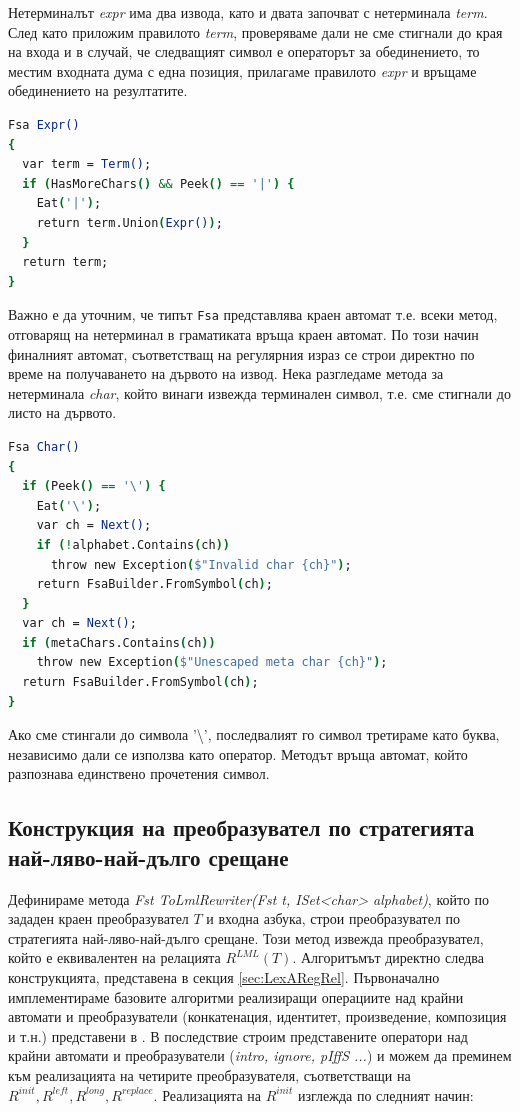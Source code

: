 \documentclass[12pt, oneside]{article}
\theoremstyle{definition}
\begin{document}
Нетерминалът \emph{expr} има два извода, като и двата започват с нетерминала \emph{term}. След като приложим правилото \emph{term}, проверяваме дали не сме стигнали до края на входа и в случай, че следващият символ е операторът за обединението, то местим входната дума с една позиция, прилагаме правилото \emph{expr} и връщаме обединението на резултатите.

\begin{lstlisting}[language=csh]
Fsa Expr() 
{
  var term = Term();
  if (HasMoreChars() && Peek() == '|') {
    Eat('|');
    return term.Union(Expr());
  }
  return term;
}
\end{lstlisting}

Важно е да уточним, че типът \verb/Fsa/ представлява краен автомат т.е. всеки метод, отговарящ на нетерминал в граматиката връща краен автомат. По този начин финалният автомат, съответстващ на регулярния израз се строи директно по време на получаването на дървото на извод. Нека разгледаме метода за нетерминала \emph{char}, който винаги извежда терминален символ, т.е. сме стигнали до листо на дървото.

\begin{lstlisting}[language=csh]
Fsa Char() 
{
  if (Peek() == '\') {
    Eat('\');
    var ch = Next();
    if (!alphabet.Contains(ch))
      throw new Exception($"Invalid char {ch}");
    return FsaBuilder.FromSymbol(ch);
  }	
  var ch = Next();
  if (metaChars.Contains(ch))
    throw new Exception($"Unescaped meta char {ch}");
  return FsaBuilder.FromSymbol(ch);
}
\end{lstlisting}

Ако сме стингали до символа '\textbackslash', последвалият го символ третираме като буква, независимо дали се използва като оператор. Методът връща автомат, който разпознава единствено прочетения символ.

\subsection{Конструкция на преобразувател по стратегията най-ляво-най-дълго срещане}

Дефинираме метода \emph{Fst ToLmlRewriter(Fst t, ISet<char> alphabet)}, който по зададен краен преобразувател \(T\) и входна азбука, строи преобразувател по стратегията най-ляво-най-дълго срещане. Този метод извежда преобразувател, който е еквивалентен на релацията \( R^{LML}(T) \). Алгоритъмът директно следва конструкцията, представена в секция \ref{sec:LexARegRel}. Първоначално имплементираме базовите алгоритми реализиращи операциите над крайни автомати и преобразуватели (конкатенация, идентитет, произведение, композиция и т.н.) представени в \cite{Mihov:2018}. В последствие строим представените оператори над крайни автомати и преобразуватели (\emph{intro, ignore, pIffS ...}) и можем да преминем към реализацията на четирите преобразувателя, съответстващи на \( R^{init}, R^{left}, R^{long}, R^{replace} \). Реализацията на \( R^{init} \) изглежда по следният начин:
\end{document}
